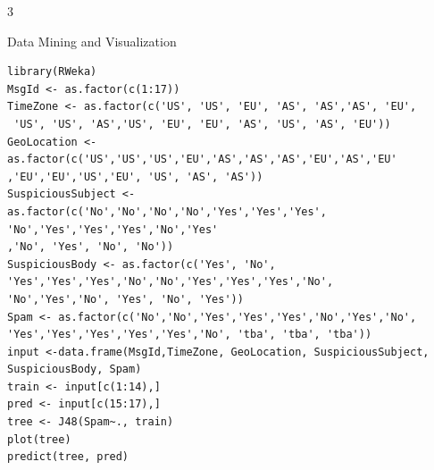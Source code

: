 \documentclass{article}
\begin{document}
\begin{ukon-infie}[15.11.17]{3}
\begin{exercise}[p=2]{}
		\end{exercise}
		
		
		


		\begin{exercise}[p=11]{Data Mining and Visualization}
		
		
\question{}		
\begin{verbatim}
library(RWeka)
MsgId <- as.factor(c(1:17))
TimeZone <- as.factor(c('US', 'US', 'EU', 'AS', 'AS','AS', 'EU',
 'US', 'US', 'AS','US', 'EU', 'EU', 'AS', 'US', 'AS', 'EU'))
GeoLocation <- as.factor(c('US','US','US','EU','AS','AS','AS','EU','AS','EU'
,'EU','EU','US','EU', 'US', 'AS', 'AS'))
SuspiciousSubject <- as.factor(c('No','No','No','No','Yes','Yes','Yes',
'No','Yes','Yes','Yes','No','Yes'
,'No', 'Yes', 'No', 'No'))
SuspiciousBody <- as.factor(c('Yes', 'No', 'Yes','Yes','Yes','No','No','Yes','Yes','Yes','No',
'No','Yes','No', 'Yes', 'No', 'Yes'))
Spam <- as.factor(c('No','No','Yes','Yes','Yes','No','Yes','No',
'Yes','Yes','Yes','Yes','Yes','No', 'tba', 'tba', 'tba'))
input <-data.frame(MsgId,TimeZone, GeoLocation, SuspiciousSubject, SuspiciousBody, Spam)
train <- input[c(1:14),]
pred <- input[c(15:17),]
tree <- J48(Spam~., train)
plot(tree)
predict(tree, pred)
\end{verbatim}


\end{exercise}
\end{ukon-infie}
\end{document}
